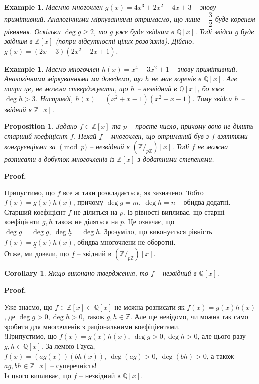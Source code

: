 \documentclass[a4paper, 10pt]{article}
\makeatletter
\theoremstyle{theoremdd}
\theoremstyle{theoremdd}
\theoremstyle{theoremdd}
\theoremstyle{theoremdd}
\theoremstyle{theoremdd}
\newtheorem{example}[theorem]{Example}
\theoremstyle{theoremdd}
\theoremstyle{theoremdd}
\theoremstyle{theoremdd}
\theoremstyle{theoremdd}
\newtheorem{proposition}[theorem]{Proposition}
\theoremstyle{theoremdd}
\theoremstyle{theoremdd}
\theoremstyle{theoremdd}
\theoremstyle{theoremdd}
\theoremstyle{theoremdd}
\newtheorem{corollary}[theorem]{Corollary}
\theoremstyle{theoremdd}
\renewenvironment{proof}[1][Proof.\\]{\par
\pushQED{\hfill \qed}%
\normalfont \topsep6\p@\@plus6\p@\relax
\trivlist
\item\relax
{\bfseries
#1\@addpunct{.}}\hspace\labelsep\ignorespaces
}{%
\popQED\endtrivlist\@endpefalse
}
\makeatother
\begin{document}
\begin{example}
Маємно многочлен $g(x) = 4x^3 + 2x^2 - 4x + 3$ -- знову примітивний. Аналогічними міркуваннями отримаємо, що лише $-\dfrac{3}{2}$ буде коренем рівняння. Оскільки $\deg g \geq 2$, то $g$ уже буде звідним в $\mathbb{Q}[x]$. Тоді звідси $g$ буде звідним в $\mathbb{Z}[x]$ (попри відсутності цілих розв'язків). Дійсно, $g(x) = (2x+3)(2x^2-2x+1)$.
\end{example}

\begin{example}
Маємо многочлен $h(x) = x^4 -3x^2 + 1$ -- знову примітивний. Аналогічними міркуваннями ми доведемо, що $h$ не має коренів в $\mathbb{Q}[x]$. Але попри це, не можна стверджувати, що $h$ -- незвідний в $\mathbb{Q}[x]$, бо вже $\deg h > 3$. Насправді, $h(x) = (x^2+x-1)(x^2-x-1)$. Тому звідси $h$ -- звідний в $\mathbb{Z}[x]$.
\end{example}

\begin{proposition}
Задано $f \in \mathbb{Z}[x]$ та $p$ -- просте число, причому воно не ділить старший коефіцієнт $f$. Нехай $\underline{f}$ -- многочлен, що отриманий був з $f$ взяттями конгруенціями за $\!\pmod p$ -- незвідний в $\left( \mathbb{Z}/_{p \mathbb{Z}} \right)[x]$. Тоді $f$ не можна розписати в добуток многочленів із $\mathbb{Z}[x]$ з додатними степенями.
\end{proposition}

\begin{proof}
Припустимо, що $f$ все ж таки розкладається, як зазначено. Тобто\\
$f(x) = g(x) h(x)$, причому $\deg g = m,\ \deg h = n$ -- обидва додатні.\\
Старший коефіцієнт $f$ не ділиться на $p$. Із рівності випливає, що старші коефіцієнти $g,h$ також не діляться на $p$. Це означає, що $\deg \underline{g} = \deg g,\ \deg \underline{h} = \deg h$. Зрозуміло, що виконується рівність\\
$\underline{f}(x) = \underline{g}(x) \underline{h}(x)$, обидва многочлени не оборотні.\\
Отже, ми довели, що $\underline{f}$ -- звідний в $\left( \mathbb{Z}/_{p \mathbb{Z}} \right)[x]$.
\end{proof}

\begin{corollary}
Якщо виконано твердження, то $f$ -- незвідний в $\mathbb{Q}[x]$.
\end{corollary}

\begin{proof}
Уже знаємо, що $f \in \mathbb{Z}[x] \subset \mathbb{Q}[x]$ не можна розписати як $f(x) = g(x)h(x)$, де $\deg g > 0, \deg h > 0$, також $g,h \in \mathbb{Z}$. Але ще невідомо, чи можна так само зробити для многочленів з раціональними коефіцієнтами.\\
!Припустимо, що $f(x) = g(x)h(x),\ \deg g > 0, \deg h > 0$, але цього разу $g,h \in \mathbb{Q}[x]$. За лемою Гауса, $f(x) = (ag(x)) (bh(x)),\ \deg (ag) > 0,\ \deg (bh) > 0$, а також $ag, bh \in \mathbb{Z}[x]$ -- суперечність!\\
Із цього випливає, що $f$ -- незвідний в $\mathbb{Q}[x]$.
\end{proof}
\end{document}
